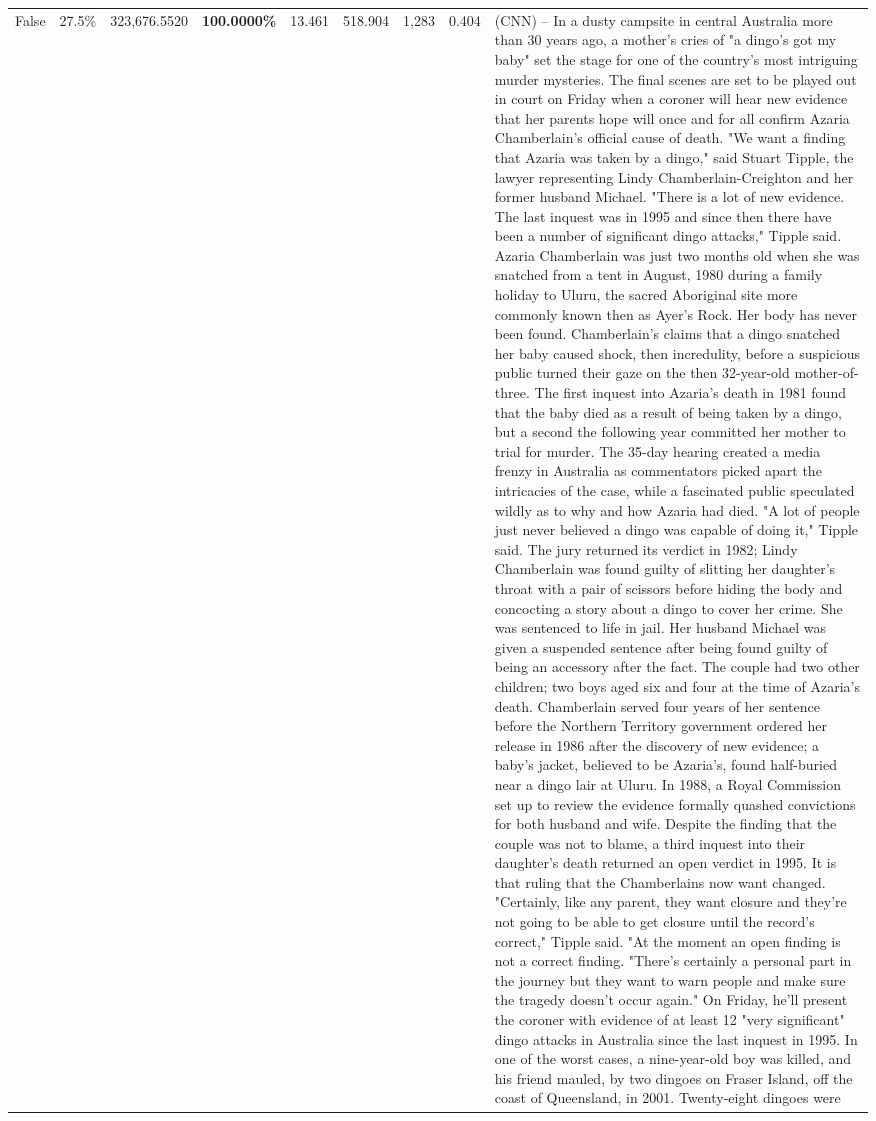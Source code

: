 \begin{table}[H]
\begin{tabular}{lllrlllll}
False & 27.5\% & 323,676.5520 & \bfseries \color{red} 100.0000\% & 13.461 & 518.904 & 1,283 & 0.404 & (CNN) -- In a dusty campsite in central Australia more than 30 years ago, a mother's cries of "a dingo's got my baby" set the stage for one of the country's most intriguing murder mysteries. The final scenes are set to be played out in court on Friday when a coroner will hear new evidence that her parents hope will once and for all confirm Azaria Chamberlain's official cause of death. "We want a finding that Azaria was taken by a dingo," said Stuart Tipple, the lawyer representing Lindy Chamberlain-Creighton and her former husband Michael. "There is a lot of new evidence. The last inquest was in 1995 and since then there have been a number of significant dingo attacks," Tipple said. Azaria Chamberlain was just two months old when she was snatched from a tent in August, 1980 during a family holiday to Uluru, the sacred Aboriginal site more commonly known then as Ayer's Rock. Her body has never been found. Chamberlain's claims that a dingo snatched her baby caused shock, then incredulity, before a suspicious public turned their gaze on the then 32-year-old mother-of-three. The first inquest into Azaria's death in 1981 found that the baby died as a result of being taken by a dingo, but a second the following year committed her mother to trial for murder. The 35-day hearing created a media frenzy in Australia as commentators picked apart the intricacies of the case, while a fascinated public speculated wildly as to why and how Azaria had died. "A lot of people just never believed a dingo was capable of doing it," Tipple said. The jury returned its verdict in 1982; Lindy Chamberlain was found guilty of slitting her daughter's throat with a pair of scissors before hiding the body and concocting a story about a dingo to cover her crime. She was sentenced to life in jail. Her husband Michael was given a suspended sentence after being found guilty of being an accessory after the fact. The couple had two other children; two boys aged six and four at the time of Azaria's death. Chamberlain served four years of her sentence before the Northern Territory government ordered her release in 1986 after the discovery of new evidence; a baby's jacket, believed to be Azaria's, found half-buried near a dingo lair at Uluru. In 1988, a Royal Commission set up to review the evidence formally quashed convictions for both husband and wife. Despite the finding that the couple was not to blame, a third inquest into their daughter's death returned an open verdict in 1995. It is that ruling that the Chamberlains now want changed. "Certainly, like any parent, they want closure and they're not going to be able to get closure until the record's correct," Tipple said. "At the moment an open finding is not a correct finding. "There's certainly a personal part in the journey but they want to warn people and make sure the tragedy doesn't occur again." On Friday, he'll present the coroner with evidence of at least 12 "very significant" dingo attacks in Australia since the last inquest in 1995. In one of the worst cases, a nine-year-old boy was killed, and his friend mauled, by two dingoes on Fraser Island, off the coast of Queensland, in 2001. Twenty-eight dingoes were 
\end{tabular}
\end{table}
